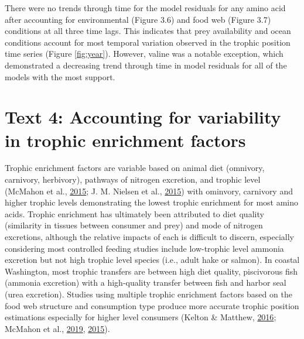 \documentclass [11pt, proquest] {uwthesis}[2015/03/03]
\begin{document}
There were no trends through time for the model residuals for any amino
acid after accounting for environmental (Figure 3.6) and food web
(Figure 3.7) conditions at all three time lags. This indicates that prey
availability and ocean conditions account for most temporal variation
observed in the trophic position time series (Figure \ref{fig:year}).
However, valine was a notable exception, which demonstrated a decreasing
trend through time in model residuals for all of the models with the
most support.

\section{Text 4: Accounting for variability in trophic enrichment
factors}\label{text-4-accounting-for-variability-in-trophic-enrichment-factors}

Trophic enrichment factors are variable based on animal diet (omnivory,
carnivory, herbivory), pathways of nitrogen excretion, and trophic level
(McMahon et al., \protect\hyperlink{ref-McMahon2015}{2015}; J. M.
Nielsen et al., \protect\hyperlink{ref-Nielsen2015}{2015}) with
ominvory, carnivory and higher trophic levels demonstrating the lowest
trophic enrichment for most amino acids. Trophic enrichment has
ultimately been attributed to diet quality (similarity in tissues
between consumer and prey) and mode of nitrogen excretions, although the
relative impacts of each is difficult to discern, especially considering
most controlled feeding studies include low-trophic level ammonia
excretion but not high trophic level species (i.e., adult hake or
salmon). In coastal Washington, most trophic transfers are between high
diet quality, piscivorous fish (ammonia excretion) with a high-quality
transfer between fish and harbor seal (urea excretion). Studies using
multiple trophic enrichment factors based on the food web structure and
consumption type produce more accurate trophic position estimations
especially for higher level consumers (Kelton \& Matthew,
\protect\hyperlink{ref-McMahon2016}{2016}; McMahon et al.,
\protect\hyperlink{ref-McMahon2019}{2019},
\protect\hyperlink{ref-McMahon2015}{2015}).
\end{document}
